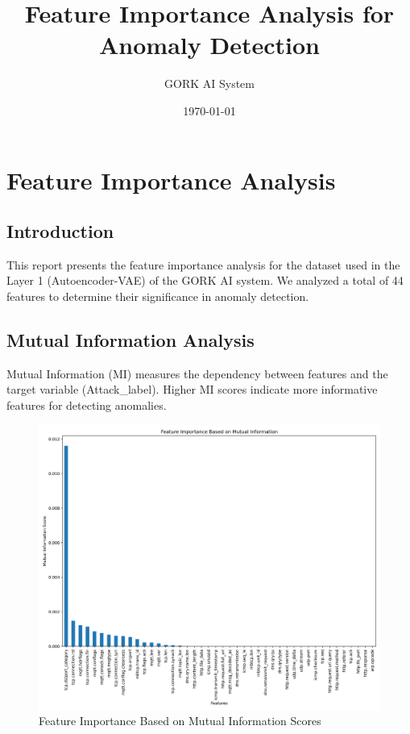 \documentclass{article}
\title{Feature Importance Analysis for Anomaly Detection}
\author{GORK AI System}
\date{\today}
\begin{document}
\maketitle
\section{Feature Importance Analysis}
\subsection{Introduction}
This report presents the feature importance analysis for the dataset used in the Layer 1 (Autoencoder-VAE) of the GORK AI system. We analyzed a total of 44 features to determine their significance in anomaly detection.
\subsection{Mutual Information Analysis}
Mutual Information (MI) measures the dependency between features and the target variable (Attack\_label). Higher MI scores indicate more informative features for detecting anomalies.
\begin{figure}[ht]
\centering
\includegraphics[width=\textwidth]{plots/mutual_information_scores.png}
\caption{Feature Importance Based on Mutual Information Scores}
\label{fig:mi_scores}
\end{figure}
\end{document}
